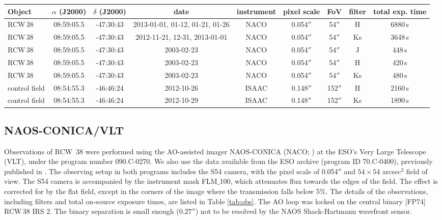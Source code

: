 \documentclass[a4paper,fleqn,usenatbib]{mnras}
\begin{document}
\begin{table*}
\caption{Summary of the observations.}
\label{tab:obs}
\begin{tabular}{lcccccccc}
\hline
Object & $\alpha$ (J2000) & $\delta$ (J2000) & date & instrument & pixel scale & FoV & filter & total exp. time\\
\hline
RCW\,38 & 08:59:05.5 & -47:30:43 & 2013-01-01, 01-12, 01-21, 01-26 & NACO & 0.054$''$ & 54$''$ & H & 6880\,s\\
RCW\,38 & 08:59:05.5 & -47:30:43 & 2012-11-21, 12-31, 2013-01-01			  & NACO & 0.054$''$ & 54$''$ & Ks & 3648\,s\\
RCW\,38 & 08:59:05.5 & -47:30:43 & 2003-02-23 & NACO & 0.054$''$ & 54$''$ & J & 448\,s\\
RCW\,38 & 08:59:05.5 & -47:30:43 & 2003-02-23 & NACO & 0.054$''$ & 54$''$ & H & 420\,s\\
RCW\,38 & 08:59:05.5 & -47:30:43 & 2003-02-23 & NACO & 0.054$''$ & 54$''$ & Ks & 480\,s\\
control field &  08:54:55.3  & -46:46:24 & 2012-10-26 & ISAAC & 0.148$''$ & 152$''$ & H & 2160\,s\\
control field &  08:54:55.3  & -46:46:24 & 2012-10-29 & ISAAC & 0.148$''$ & 152$''$ & Ks & 1890\,s\\
\hline
\end{tabular}
\end{table*}



\subsection{NAOS-CONICA/VLT}
Observations of RCW~38 were performed using the AO-assisted imager NAOS-CONICA (NACO; \citealt{lenzen03,rousset03}) at the 
ESO's Very Large Telescope (VLT), under the program number 090.C-0270. We also use the data available from the ESO archive (program ID 70.C-0400),  
previously published in \citet{derose09}. The observing setup in both programs includes the S54 camera, with the pixel scale
of 0.054$''$ and $54 \times 54$ arcsec$^2$ field of view. 
The S54 camera is accompanied by the instrument mask FLM$\_$100, which attenuates flux towards the edges of the field. The effect
is corrected for by the flat field, except in the corners of the image where the transmission falls below 5\%. 
The details of the observations, including filters and total on-source
exposure times, are listed in Table \ref{tab:obs}. The AO loop was locked on the central binary [FP74] RCW\,38 IRS 2. The binary 
separation is small enough ($0.27''$) not to be resolved by the NAOS Shack-Hartmann wavefront sensor. 
\end{document}
